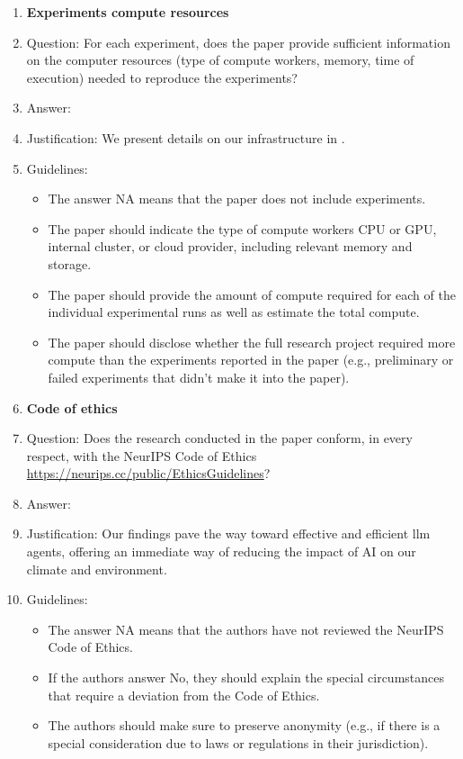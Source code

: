 \documentclass{article}
\begin{document}
\begin{enumerate}
\item {\bf Experiments compute resources}
    \item[] Question: For each experiment, does the paper provide sufficient information on the computer resources (type of compute workers, memory, time of execution) needed to reproduce the experiments?
    \item[] Answer: \answerYes{} %
    \item[] Justification: We present details on our infrastructure in .
    \item[] Guidelines:
    \begin{itemize}
        \item The answer NA means that the paper does not include experiments.
        \item The paper should indicate the type of compute workers CPU or GPU, internal cluster, or cloud provider, including relevant memory and storage.
        \item The paper should provide the amount of compute required for each of the individual experimental runs as well as estimate the total compute. 
        \item The paper should disclose whether the full research project required more compute than the experiments reported in the paper (e.g., preliminary or failed experiments that didn't make it into the paper). 
    \end{itemize}
    
\item {\bf Code of ethics}
    \item[] Question: Does the research conducted in the paper conform, in every respect, with the NeurIPS Code of Ethics \url{https://neurips.cc/public/EthicsGuidelines}?
    \item[] Answer: \answerYes{} %
    \item[] Justification: Our findings pave the way toward effective and efficient \ac{llm} agents, offering an immediate way of reducing the impact of AI on our climate and environment.
    \item[] Guidelines:
    \begin{itemize}
        \item The answer NA means that the authors have not reviewed the NeurIPS Code of Ethics.
        \item If the authors answer No, they should explain the special circumstances that require a deviation from the Code of Ethics.
        \item The authors should make sure to preserve anonymity (e.g., if there is a special consideration due to laws or regulations in their jurisdiction).
    \end{itemize}



\end{enumerate}
\end{document}
